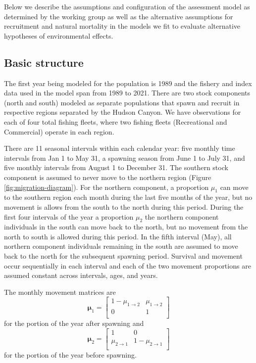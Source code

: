 \documentclass[
]{article}
\begin{document}
Below we describe the assumptions and configuration of the assessment
model as determined by the working group as well as the alternative
assumptions for recruitment and natural mortality in the models we fit
to evaluate alternative hypotheses of environmental effects.

\hypertarget{basic-structure}{%
\subsection*{Basic structure}\label{basic-structure}}

The first year being modeled for the population is 1989 and the fishery
and index data used in the model span from 1989 to 2021. There are two
stock components (north and south) modeled as separate populations that
spawn and recruit in respective regions separated by the Hudson Canyon.
We have observations for each of four total fishing fleets, where two
fishing fleets (Recreational and Commercial) operate in each region.

There are 11 seasonal intervals within each calendar year: five monthly
time intervals from Jan 1 to May 31, a spawning season from June 1 to
July 31, and five monthly intervals from August 1 to December 31. The
southern stock component is assumed to never move to the northern region
(Figure \ref{fig:migration-diagram}). For the northern component, a
proportion \(\mu_1\) can move to the southern region each month during
the last five months of the year, but no movement is allows from the
south to the north during this period. During the first four intervals
of the year a proportion \(\mu_2\) the northern component individuals in
the south can move back to the north, but no movement from the north to
south is allowed during this period. In the fifth interval (May), all
northern component individuals remaining in the south are assumed to
move back to the north for the subsequent spawning period. Survival and
movement occur sequentially in each interval and each of the two
movement proportions are assumed constant across intervals, ages, and
years.

The monthly movement matrices are \begin{equation*}
\boldsymbol{\mu}_{1} = 
  \begin{bmatrix}
     1-\mu_{1\rightarrow 2} & \mu_{1\rightarrow 2} \\
     0 & 1 \\
  \end{bmatrix}
\end{equation*} for the portion of the year after spawning and
\begin{equation*}
\boldsymbol{\mu}_{2} = 
  \begin{bmatrix}
     1 &  0 \\
     \mu_{2\rightarrow 1} & 1-\mu_{2\rightarrow 1} \\
  \end{bmatrix}
\end{equation*} for the portion of the year before spawning.
\end{document}
